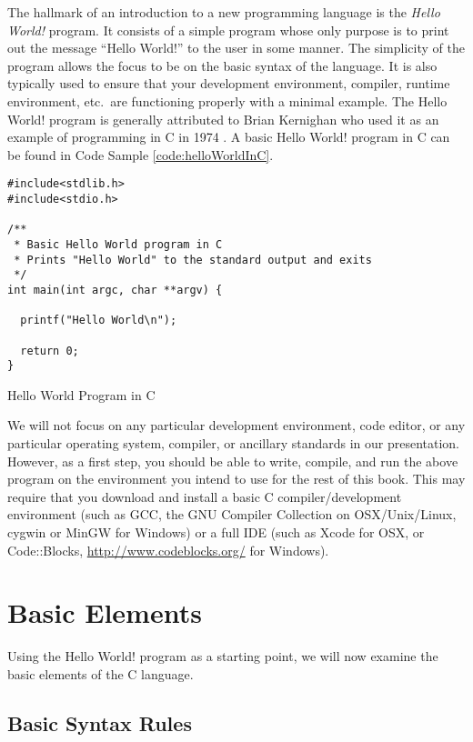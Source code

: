 The hallmark of an introduction to a new programming language is 
the \emph{Hello World!} program.  It consists of a simple program whose 
only purpose is to print out the message ``Hello World!'' to the user 
in some manner.  The simplicity of the program allows the
focus to be on the basic syntax of the language.  It is also typically used to ensure that 
your development environment, compiler, runtime environment, etc.\ are functioning 
properly with a minimal example.  The Hello World! program is generally attributed to 
Brian Kernighan who used it as an example of programming in C in 1974 \cite{Kernighan:1974}.
A basic Hello World! program in C can be found in Code Sample \ref{code:helloWorldInC}.

\begin{listing}
\begin{verbatim}
#include<stdlib.h>
#include<stdio.h>

/**
 * Basic Hello World program in C
 * Prints "Hello World" to the standard output and exits
 */
int main(int argc, char **argv) {

  printf("Hello World\n");

  return 0;
}
\end{verbatim}
\caption{Hello World Program in C}
\label{code:helloWorldInC}
\end{listing}

We will not focus on any particular development environment, code editor, or any 
particular operating system, compiler, or ancillary standards in our presentation.  However,
as a first step, you should be able to write, compile, and run the above program on the
environment you intend to use for the rest of this book.  This may require that you download
and install a basic C compiler/development environment (such as GCC, the GNU Compiler 
Collection on OSX/Unix/Linux, cygwin or MinGW for Windows) or a full IDE (such as Xcode 
for OSX, or Code::Blocks, \url{http://www.codeblocks.org/} for Windows).

\section{Basic Elements}

Using the Hello World! program as a starting point, we will now examine the basic
elements of the C language.

\subsection{Basic Syntax Rules}

